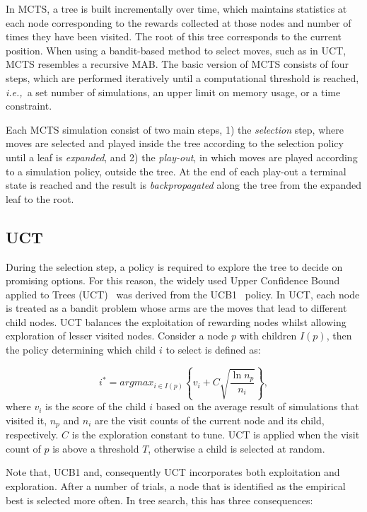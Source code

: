 \documentclass[a4paper]{llncs}
\newcommand{\ie}{{\it i.e.,}~}
\begin{document}
In MCTS, a tree is built incrementally over time, which maintains statistics at each node corresponding to the rewards collected at those nodes and number of times they have been visited. The root of this tree corresponds to the current position. 
When using a bandit-based method to select moves, such as in UCT, MCTS resembles a recursive MAB.
The basic version of MCTS consists of four steps, which are performed iteratively until a computational threshold is reached, \ie a set number of simulations, an upper limit on memory usage, or a time constraint. 

Each MCTS simulation consist of two main steps, 1) the \emph{selection} step, where moves are selected and played inside the tree according to the selection policy until a leaf is \emph{expanded}, and 2) the \emph{play-out}, in which moves are played according to a simulation policy, outside the tree. At the end of each play-out a terminal state is reached and the result is \emph{backpropagated} along the tree from the expanded leaf to the root.

\subsection{UCT}
\label{subsec:uct}
During the selection step, a policy is required to explore the tree to decide on promising options. For this reason, the widely used Upper Confidence Bound applied to Trees (UCT)~\cite{kocsis2006bandit} was derived from the UCB1~\cite{auer2002using} policy. In UCT, each node is treated as a bandit problem whose arms are the moves that lead to different child nodes. UCT balances the exploitation of rewarding nodes whilst allowing exploration of lesser visited nodes. Consider a node $p$ with children $I(p)$, then the policy determining which child $i$ to select is defined as:

\begin{equation}
\label{eq:uct}
i^* = argmax_{i \in I(p)}\left\{ v_i + C \sqrt{ \frac{\ln{n_p}}{n_i}}\right\},
\end{equation}
where $v_i$ is the score of the child $i$ based on the average result of simulations that visited it, $n_p$ and $n_i$ are the visit counts of the current node and its child, respectively. $C$ is the exploration constant to tune. UCT is applied when the visit count of $p$ is above a threshold $T$, otherwise a child is selected at random.

Note that, UCB1 and, consequently UCT incorporates both exploitation and exploration. After a number of trials, a node that is identified as the empirical best is selected more often. In tree search, this has three consequences:
\end{document}
